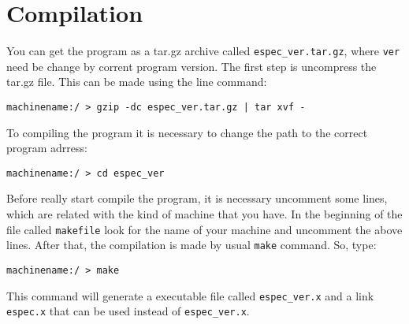 \chapter{Compilation}

You can get the program as a tar.gz archive called \texttt{espec\_ver.tar.gz}, where \texttt{ver} need be change by corrent program version. The first step is uncompress the tar.gz file. This can be made using the line command:
\begin{verbatim}
machinename:/ > gzip -dc espec_ver.tar.gz | tar xvf -
\end{verbatim} 

To compiling the program it is necessary to change the path to the correct program adrress:
\begin{verbatim}
machinename:/ > cd espec_ver
\end{verbatim}
Before really start compile the program, it is necessary uncomment some lines, which are related with the kind of machine that you have. In the beginning of the file called \texttt{makefile} look for the name of your machine and uncomment the above lines. After that, the compilation is made by usual \texttt{make} command. So, type: 
\begin{verbatim}
machinename:/ > make
\end{verbatim}
This command will generate a executable file called \texttt{espec\_ver.x} and a link \texttt{espec.x} that can be used instead of \texttt{espec\_ver.x}.

